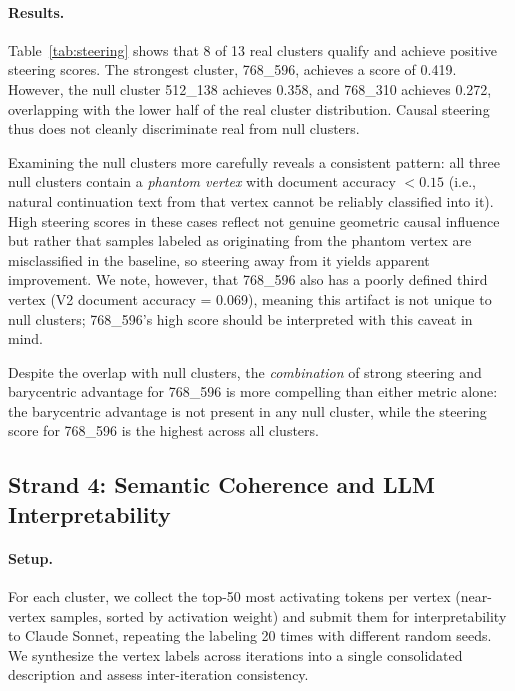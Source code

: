 \documentclass{article}
\begin{document}
\paragraph{Results.}  Table~\ref{tab:steering} shows that 8 of 13 real clusters
qualify and achieve positive steering scores.  The strongest cluster, 768\_596,
achieves a score of 0.419.  However, the null cluster 512\_138 achieves 0.358, and
768\_310 achieves 0.272, overlapping with the lower half of the real cluster
distribution.  Causal steering thus does not cleanly discriminate real from null
clusters.

Examining the null clusters more carefully reveals a consistent pattern: all three
null clusters contain a \emph{phantom vertex} with document accuracy $< 0.15$ (i.e.,
natural continuation text from that vertex cannot be reliably classified into it).
High steering scores in these cases reflect not genuine geometric causal influence
but rather that samples labeled as originating from the phantom vertex are
misclassified in the baseline, so steering away from it yields apparent
improvement.  We note, however, that 768\_596 also has a poorly defined third vertex
(V2 document accuracy = 0.069), meaning this artifact is not unique to null clusters;
768\_596's high score should be interpreted with this caveat in mind.

Despite the overlap with null clusters, the \emph{combination} of strong steering
and barycentric advantage for 768\_596 is more compelling than either metric alone:
the barycentric advantage is not present in any null cluster, while the steering
score for 768\_596 is the highest across all clusters.

\subsection{Strand 4: Semantic Coherence and LLM Interpretability}
\label{sec:interp}

\paragraph{Setup.}  For each cluster, we collect the top-50 most activating tokens
per vertex (near-vertex samples, sorted by activation weight) and submit them for
interpretability to Claude Sonnet, repeating the labeling 20 times with different
random seeds.  We synthesize the vertex labels across iterations into a single
consolidated description and assess inter-iteration consistency.
\end{document}

